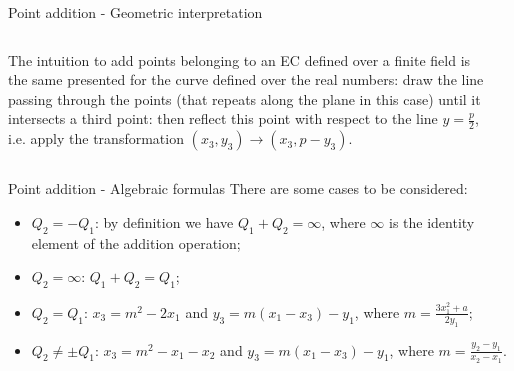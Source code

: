 \documentclass[slidescentered]{beamer}
\newcommand{\backupbegin}{
	\newcounter{framenumberappendix}
	\setcounter{framenumberappendix}{\value{framenumber}}
}
\begin{document}
	\appendix
	\backupbegin
	\begin{frame}[label=point_addition]{Point addition - Geometric interpretation}
		\begin{columns}
			\begin{column}{0.5\linewidth}
				The intuition to add points belonging to an EC defined over a finite field is the same presented for the curve defined over the real numbers: draw the line passing through the points (that repeats along the plane in this case) until it intersects a third point: then reflect this point with respect to the line $y = \frac{p}{2}$, i.e. apply the transformation $(x_3, y_3) \to (x_3, p - y_3)$.
			\end{column}
			\begin{column}{0.6\linewidth}
			\end{column}
		\end{columns}
	\end{frame}

	\begin{frame}{Point addition - Algebraic formulas}
		There are some cases to be considered:
		\begin{itemize}
			\item $Q_2 = -Q_1$: by definition we have $Q_1 + Q_2 = \infty$, where $\infty$ is the identity element of the addition operation;
			\item $Q_2 = \infty$: $Q_1 + Q_2 = Q_1$;
			\item $Q_2 = Q_1$: $x_3 = m^2 - 2x_1$ and $y_3 = m(x_1 - x_3) - y_1$, where $m = \frac{3x_1^2 + a}{2y_1}$;
			\item $Q_2 \neq \pm Q_1$: $x_3 = m^2 - x_1 - x_2$ and $y_3 = m(x_1 - x_3) - y_1$, where $m = \frac{y_2 - y_1}{x_2 - x_1}$.
		\end{itemize}
	\end{frame}
	
\end{document}
